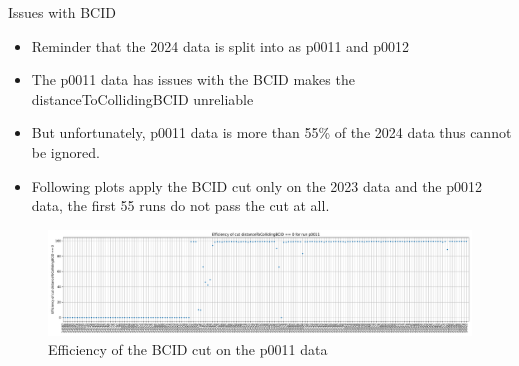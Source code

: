 \begin{frame}{Issues with BCID}
	\begin{itemize}
		\item Reminder that the 2024 data is split into as p0011 and p0012
		\item The p0011 data has issues with the BCID makes the distanceToCollidingBCID unreliable
		\item But unfortunately, p0011 data is more than 55\% of the 2024 data thus cannot be ignored.
		\item Following plots apply the BCID cut only on the 2023 data and the p0012 data, the first 55 runs do not pass the cut at all.
	\end{itemize}
	\begin{figure}
		\includegraphics[width=\linewidth]{./assets/BCIDEfficiency_p0011.pdf}
		\caption{Efficiency of the BCID cut on the p0011 data}
	\end{figure}

\end{frame}

